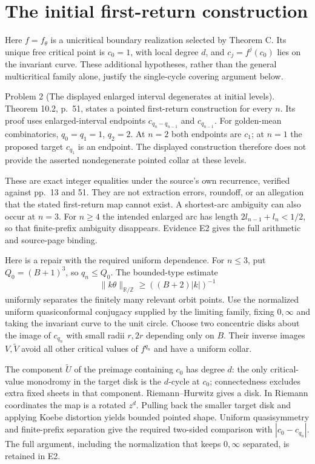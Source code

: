 \documentclass[10pt]{article}
\begin{document}
\section*{The initial first-return construction}
Here \(f=f_\theta\) is a unicritical boundary realization selected by Theorem C. Its unique free critical point is \(c_0=1\), with local degree \(d\), and \(c_j=f^j(c_0)\) lies on the invariant curve. These additional hypotheses, rather than the general multicritical family alone, justify the single-cycle covering argument below.\par
Problem 2 (The displayed enlarged interval degenerates at initial levels).  Theorem 10.2, p. 51, states a pointed first-return construction for every \(n\). Its proof uses enlarged-interval endpoints \(c_{q_n-q_{n-1}}\) and \(c_{q_{n-1}}\). For golden-mean combinatorics, \(q_0=q_1=1\), \(q_2=2\). At \(n=2\) both endpoints are \(c_1\); at \(n=1\) the proposed target \(c_{q_1}\) is an endpoint. The displayed construction therefore does not provide the asserted nondegenerate pointed collar at these levels.\par
These are exact integer equalities under the source’s own recurrence, verified against pp. 13 and 51. They are not extraction errors, roundoff, or an allegation that the stated first-return map cannot exist. A shortest-arc ambiguity can also occur at \(n=3\). For \(n\geq4\) the intended enlarged arc has length \(2l_{n-1}+l_n<1/2\), so that finite-prefix ambiguity disappears. Evidence E2 gives the full arithmetic and source-page binding.\par
Here is a repair with the required uniform dependence. For \(n\leq3\), put \(Q_0=(B+1)^3\), so \(q_n\leq Q_0\). The bounded-type estimate \[\|k\theta\|_{\mathbb R/\mathbb Z}\geq((B+2)|k|)^{-1}\] uniformly separates the finitely many relevant orbit points. Use the normalized uniform quasiconformal conjugacy supplied by the limiting family, fixing \(0,\infty\) and taking the invariant curve to the unit circle. Choose two concentric disks about the image of \(c_{q_n}\) with small radii \(r,2r\) depending only on \(B\). Their inverse images \(V,\widetilde V\) avoid all other critical values of \(f^{q_n}\) and have a uniform collar.\par
The component \(\widetilde U\) of the preimage containing \(c_0\) has degree \(d\): the only critical-value monodromy in the target disk is the \(d\)-cycle at \(c_0\); connectedness excludes extra fixed sheets in that component. Riemann–Hurwitz gives a disk. In Riemann coordinates the map is a rotated \(z^d\). Pulling back the smaller target disk and applying Koebe distortion yields bounded pointed shape. Uniform quasisymmetry and finite-prefix separation give the required two-sided comparison with \(|c_0-c_{q_n}|\). The full argument, including the normalization that keeps \(0,\infty\) separated, is retained in E2.\par
\end{document}
